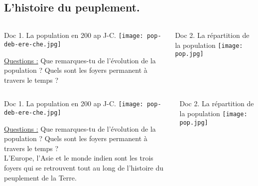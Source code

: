 \documentclass{beamer}
\begin{document}
\subsection{L'histoire du peuplement.}

\begin{frame}
\begin{columns}
\begin{column}[b]{5cm}
\begin{beamerboxesrounded}[scheme=blocimage]{Doc 1. La population en 200 ap J-C.} 
\texttt{[image: pop-deb-ere-che.jpg]}
\end{beamerboxesrounded}
\vfill
\underline{Questions :} 
Que remarques-tu de l'évolution de la population ? Quels sont les foyers permanent à travers le temps ? \\
\end{column}
\begin{column}[b]{5cm}
\begin{beamerboxesrounded}[scheme=blocimage]{Doc 2. La répartition de la population} 
\texttt{[image: pop.jpg]}
\end{beamerboxesrounded}
\end{column}
\end{columns}
\end{frame}

\begin{frame}
\begin{columns}
\begin{column}[b]{5cm}
\begin{beamerboxesrounded}[scheme=blocimage]{Doc 1. La population en 200 ap J-C.} 
\texttt{[image: pop-deb-ere-che.jpg]}
\end{beamerboxesrounded}
\vfill
\underline{Questions :} 
Que remarques-tu de l'évolution de la population ? Quels sont les foyers permanent à travers le temps ? \\
\textcolor{black!70!green}{L'Europe, l'Asie et le monde indien sont les trois foyers qui se retrouvent tout au long de l'histoire du peuplement de la Terre.}\\
\end{column}
\begin{column}[b]{5cm}
\begin{beamerboxesrounded}[scheme=blocimage]{Doc 2. La répartition de la population} 
\texttt{[image: pop.jpg]}
\end{beamerboxesrounded}
\end{column}
\end{columns}
\end{frame}
\end{document}
